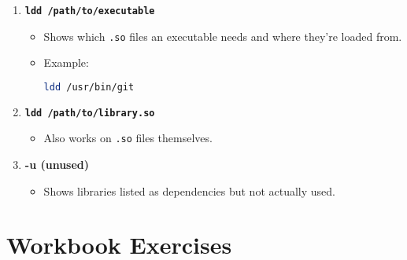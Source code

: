 \documentclass[a4paper]{report}
\begin{document}
\begin{enumerate}
    \item \textbf{\texttt{ldd /path/to/executable}}
    \begin{itemize}
        \item Shows which \texttt{.so} files an executable needs and where they’re loaded from.
        \item Example:
        \begin{lstlisting}[language=bash]
ldd /usr/bin/git
        \end{lstlisting}
    \end{itemize}

    \item \textbf{\texttt{ldd /path/to/library.so}}
    \begin{itemize}
        \item Also works on \texttt{.so} files themselves.
    \end{itemize}

    \item \textbf{-u (unused)}
    \begin{itemize}
        \item Shows libraries listed as dependencies but not actually used.
    \end{itemize}
\end{enumerate}

\section*{Workbook Exercises}
\end{document}
